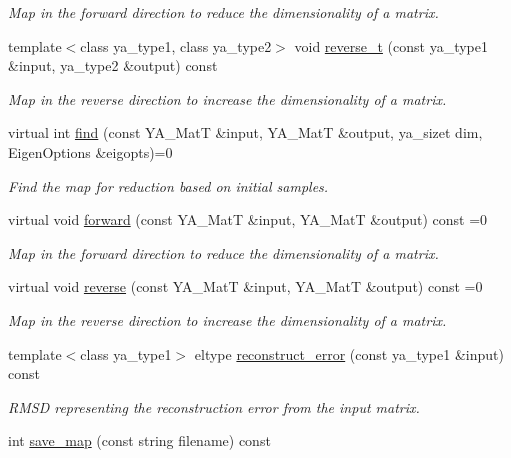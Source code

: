 \begin{CompactItemize}
\begin{CompactList}\small\item\em Map in the forward direction to reduce the dimensionality of a matrix. \item\end{CompactList}\item 
\hypertarget{class_y_a_dim_reduce_a7}{
template$<$class ya\_\-type1, class ya\_\-type2$>$ void \hyperlink{class_y_a_dim_reduce_a7}{reverse\_\-t} (const ya\_\-type1 \&input, ya\_\-type2 \&output) const }
\label{class_y_a_dim_reduce_a7}

\begin{CompactList}\small\item\em Map in the reverse direction to increase the dimensionality of a matrix. \item\end{CompactList}\item 
virtual int \hyperlink{class_y_a_dim_reduce_a8}{find} (const YA\_\-Mat\-T \&input, YA\_\-Mat\-T \&output, ya\_\-sizet dim, Eigen\-Options \&eigopts)=0
\begin{CompactList}\small\item\em Find the map for reduction based on initial samples. \item\end{CompactList}\item 
\hypertarget{class_y_a_dim_reduce_a9}{
virtual void \hyperlink{class_y_a_dim_reduce_a9}{forward} (const YA\_\-Mat\-T \&input, YA\_\-Mat\-T \&output) const =0}
\label{class_y_a_dim_reduce_a9}

\begin{CompactList}\small\item\em Map in the forward direction to reduce the dimensionality of a matrix. \item\end{CompactList}\item 
\hypertarget{class_y_a_dim_reduce_a10}{
virtual void \hyperlink{class_y_a_dim_reduce_a10}{reverse} (const YA\_\-Mat\-T \&input, YA\_\-Mat\-T \&output) const =0}
\label{class_y_a_dim_reduce_a10}

\begin{CompactList}\small\item\em Map in the reverse direction to increase the dimensionality of a matrix. \item\end{CompactList}\item 
template$<$class ya\_\-type1$>$ eltype \hyperlink{class_y_a_dim_reduce_a11}{reconstruct\_\-error} (const ya\_\-type1 \&input) const 
\begin{CompactList}\small\item\em RMSD representing the reconstruction error from the input matrix. \item\end{CompactList}\item 
\hypertarget{class_y_a_dim_reduce_a12}{
int \hyperlink{class_y_a_dim_reduce_a12}{save\_\-map} (const string filename) const }
\label{class_y_a_dim_reduce_a12}


\end{CompactItemize}
